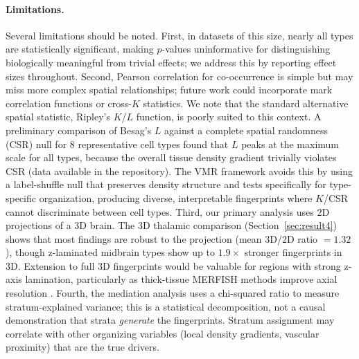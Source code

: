 \documentclass[11pt,a4paper]{article}
\begin{document}
\paragraph{Limitations.}
Several limitations should be noted. First, in datasets of this size, nearly all
types are statistically significant, making $p$-values uninformative for
distinguishing biologically meaningful from trivial effects; we address this by
reporting effect sizes throughout. Second, Pearson correlation for co-occurrence
is simple but may miss more complex spatial relationships; future work could
incorporate mark correlation functions or cross-$K$ statistics.
We note that the standard alternative spatial statistic, Ripley's $K$/$L$ function,
is poorly suited to this context. A preliminary comparison of Besag's $L$
against a complete spatial randomness (CSR) null for 8 representative cell types
found that $L$ peaks at the maximum scale for all types, because the overall
tissue density gradient trivially violates CSR (data available in the
repository). The VMR framework avoids this by using a label-shuffle null that
preserves density structure and tests specifically for type-specific
organization, producing diverse, interpretable fingerprints where $K$/CSR
cannot discriminate between cell types. Third, our
primary analysis uses 2D projections of a 3D brain. The 3D thalamic comparison
(Section~\ref{sec:result4}) shows that most findings are robust to the projection
(mean 3D/2D ratio $= 1.32$), though z-laminated midbrain types show up to
$1.9\times$ stronger fingerprints in 3D. Extension to full 3D fingerprints would
be valuable for regions with strong z-axis lamination, particularly as
thick-tissue MERFISH methods improve axial resolution \citep{Fang2024}. Fourth, the mediation
analysis uses a chi-squared ratio to measure stratum-explained variance; this is
a statistical decomposition, not a causal demonstration that strata \emph{generate}
the fingerprints. Stratum assignment may correlate with other organizing variables
(local density gradients, vascular proximity) that are the true drivers.

\end{document}
